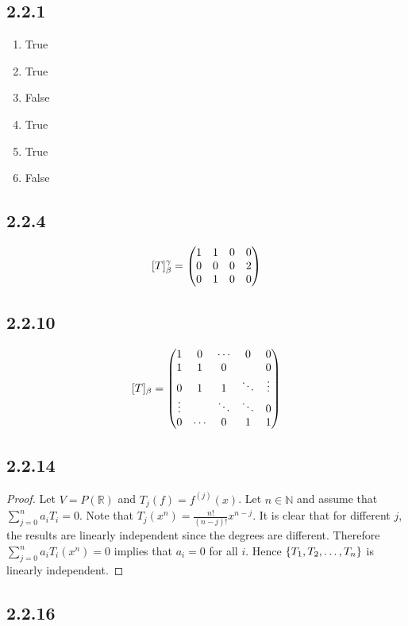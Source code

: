 \documentclass[12pt,titlepage]{extarticle}
\begin{document}
\subsection*{2.2.1}
\begin{enumerate}
    \item True
    \item True
    \item False
    \item True
    \item True
    \item False
\end{enumerate}

\subsection*{2.2.4}
\[
    [T]_\beta^\gamma = \mqty(
    1 & 1 & 0 & 0 \\
    0 & 0 & 0 & 2 \\
    0 & 1 & 0 & 0
    )
\]

\subsection*{2.2.10}
\[
    [T]_\beta = \mqty(
    1 & 0 & \cdots & 0 & 0\\
    1 & 1 & 0 &   & 0\\
    0 & 1 & 1 & \ddots & \vdots\\
    \vdots &   & \ddots & \ddots & 0\\
    0 & \cdots & 0 & 1 & 1\\
    )
\]

\subsection*{2.2.14}
\begin{proof}
    Let $V = P(\mathbb{R})$ and $T_j(f) = f^{(j)}(x)$. Let $n\in \mathbb{N}$ and assume that $\sum_{j=0}^{n} a_i T_i = 0$. Note that $T_j(x^n) = \frac{n!}{(n-j)!} x^{n-j}$. It is clear that for different $j$, the results are linearly independent since the degrees are different. Therefore $\sum_{j=0}^{n} a_i T_i(x^n) = 0$ implies that $a_i = 0$ for all $i$. Hence $\qty{T_1, T_2, \ldots, T_n}$ is linearly independent. 
\end{proof}

\subsection*{2.2.16}
\end{document}
